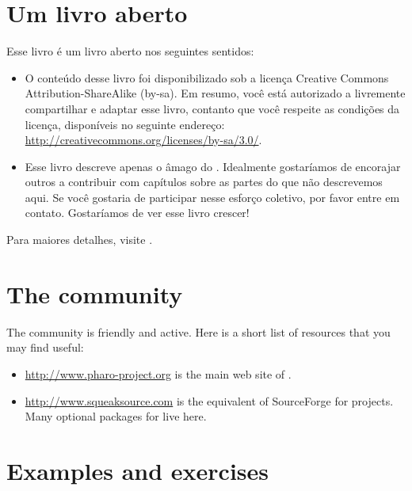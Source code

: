 \documentclass[a4paper,10pt,twoside]{book}
\begin{document}
\section*{Um livro aberto}

Esse livro é um livro aberto nos seguintes sentidos:

\begin{itemize}

\item	O conteúdo desse livro foi disponibilizado sob a licença Creative Commons Attribution-ShareAlike (by-sa).
		Em resumo, você está autorizado a livremente compartilhar e adaptar esse livro, contanto que você respeite as condições da licença, disponíveis no seguinte endereço:
		\url{http://creativecommons.org/licenses/by-sa/3.0/}.

\item	Esse livro descreve apenas o âmago do \pharo.
		Idealmente gostaríamos de encorajar outros a contribuir com capítulos
		sobre as partes do \pharo que não descrevemos aqui.
		Se você gostaria de participar nesse esforço coletivo, por favor
		entre em contato.  Gostaríamos de ver esse livro crescer!
\end{itemize}

Para maiores detalhes, visite \pbe.

\section*{The \pharo community}

The \pharo community is friendly and active.
Here is a short list of resources that you may find useful:

\begin{itemize}
\item \url{http://www.pharo-project.org} is the main web site of \pharo.

\item \url{http://www.squeaksource.com} is the equivalent of SourceForge for \pharo projects.
Many optional packages for \pharo live here.
\end{itemize}

\section*{Examples and exercises}
\end{document}
